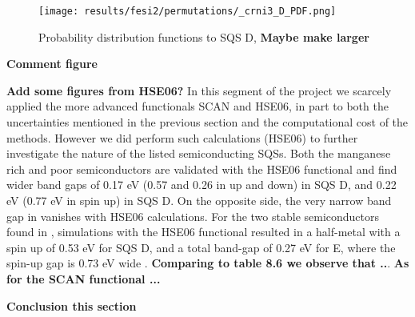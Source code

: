 \begin{figure}[H]
	\centering
	\texttt{[image: results/fesi2/permutations/\_crni3\_D\_PDF.png]}
	\caption{Probability distribution functions to  SQS D, \textbf{Maybe make larger}}
\end{figure}

\textbf{Comment figure \\}

\textbf{Add some figures from HSE06?}
In this segment of the project we scarcely applied the more advanced functionals SCAN and HSE06, in part to both the uncertainties mentioned in the previous section and the computational cost of the methods. However we did perform such calculations (HSE06) to further investigate the nature of the listed semiconducting SQSs. Both the manganese rich and poor semiconductors are validated with the HSE06 functional and find wider band gaps of 0.17 eV (0.57 and 0.26 in up and down) in  SQS D, and 0.22 eV (0.77 eV in spin up) in  SQS D. On the opposite side, the very narrow band gap in  vanishes with HSE06 calculations. For the two stable semiconductors found in , simulations with the HSE06 functional resulted in a half-metal with a spin up of 0.53 eV for SQS D, and a total band-gap of 0.27 eV for E, where the spin-up gap is 0.73 eV wide
. \textbf{Comparing to table 8.6 we observe that ..}. \textbf{As for the SCAN functional ...} 

\textbf{Conclusion this section \\}
